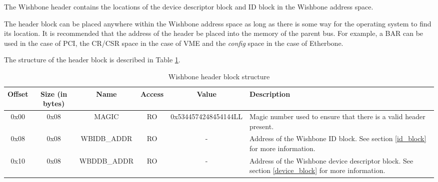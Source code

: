 \documentclass{article}
\begin{document}
The Wishbone header contains the locations of the device descriptor block and 
ID block in the Wishbone address space.

The header block can be placed anywhere within the Wishbone address space
as long as there is some way for the operating system to find its location.
It is recommended that the address of the header be placed into the memory
of the parent bus. For example, a BAR can be used in the case of PCI,
the CR/CSR space in the case of VME and the \emph{config} space in the case
of Etherbone.

The structure of the header block is described in Table \ref{hdr_block_struct}.

\begin{center}
	\begin{savenotes}
	\begin{table}[!ht]\footnotesize
	\caption{Wishbone header block structure}\label{hdr_block_struct}\centering
	\begin{tabular}{| c | c | c | c | c | p{5cm} |} \hline
	Offset & Size (in bytes) & Name & Access & Value & Description \\ \hline
	0x00 & 0x08 & MAGIC & RO & 0x5344574248454144LL & Magic number used to ensure that there is a valid header present. \\ \hline
	0x08 & 0x08 & WBIDB\_ADDR & RO & - & Address of the Wishbone ID block. See section \ref{id_block} for more information. \\ \hline
	0x10 & 0x08 & WBDDB\_ADDR & RO & - & Address of the Wishbone device descriptor block. See section \ref{device_block} for more information. \\ \hline
	\end{tabular}
	\end{table}
	\end{savenotes}
\end{center}
\end{document}
